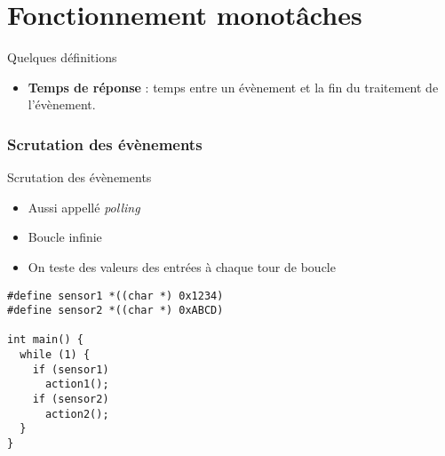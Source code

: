 %                                                                                                               
%
%

\part{Fonctionnement monotâches}

\begin{frame}{Quelques définitions}
  \begin{itemize}
  \item \textbf{Temps de réponse} : temps entre un évènement et la fin
    du traitement de l'évènement.
  \end{itemize} 
\end{frame}

\section{Scrutation des évènements}
\begin{frame}[fragile]{Scrutation des évènements}
  \begin{itemize} 
  \item Aussi appellé \emph{polling}
  \item Boucle infinie 
  \item On teste des valeurs des entrées à chaque tour de boucle
  \end{itemize} 
  \begin{lstlisting} 
#define sensor1 *((char *) 0x1234)
#define sensor2 *((char *) 0xABCD)

int main() {
  while (1) {
    if (sensor1)
      action1();
    if (sensor2)
      action2();
  }
}
  \end{lstlisting} 
\end{frame}

